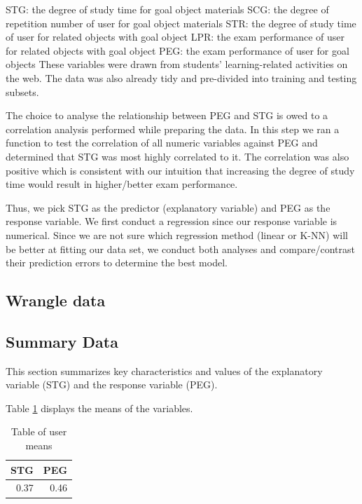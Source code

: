 \documentclass[
]{article}
\begin{document}
STG: the degree of study time for goal object materials
SCG: the degree of repetition number of user for goal object materials
STR: the degree of study time of user for related objects with goal object
LPR: the exam performance of user for related objects with goal object
PEG: the exam performance of user for goal objects
These variables were drawn from students' learning-related activities on the web. The data was also already tidy and pre-divided into training and testing subsets.

The choice to analyse the relationship between PEG and STG is owed to a correlation analysis performed while preparing the data. In this step we ran a function to test the correlation of all numeric variables against PEG and determined that STG was most highly correlated to it. The correlation was also positive which is consistent with our intuition that increasing the degree of study time would result in higher/better exam performance.

Thus, we pick STG as the predictor (explanatory variable) and PEG as the response variable. We first conduct a regression since our response variable is numerical. Since we are not sure which regression method (linear or K-NN) will be better at fitting our data set, we conduct both analyses and compare/contrast their prediction errors to determine the best model.

\hypertarget{wrangle-data}{%
\subsection{Wrangle data}\label{wrangle-data}}

\hypertarget{summary-data}{%
\subsection{Summary Data}\label{summary-data}}

This section summarizes key characteristics and values of the explanatory variable (STG) and the response variable (PEG).

Table \ref{tab:user-means-table} displays the means of the variables.

\begin{table}

\caption{\label{tab:user-means-table}Table of user means}
\centering
\begin{tabular}[t]{r|r}
\hline
STG & PEG\\
\hline
0.37 & 0.46\\
\hline
\end{tabular}
\end{table}
\end{document}
